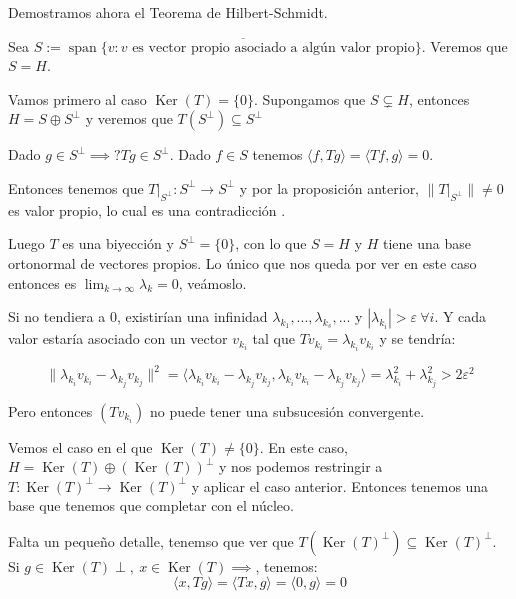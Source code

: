 \documentclass[openany]{book}
\begin{document}
Demostramos ahora el Teorema de Hilbert-Schmidt.

\begin{demonstration}

    Sea $ S:= \overline{\operatorname{span} \{v:  v \text{ es vector propio asociado a algún valor propio}\}}$. Veremos que $ S = H$.

    Vamos primero al caso $ \operatorname{Ker}(T) = \{0\}$. Supongamos que $ S \subsetneq H$, entonces $ H = S \oplus S^\perp $ y veremos que $ T(S^\perp) \subseteq  S^\perp$

    Dado $ g \in S^\perp \implies ? Tg \in S^{\perp}$. Dado $ f \in S$ tenemos $ \langle f, Tg \rangle = \langle Tf, g \rangle = 0$.

    Entonces tenemos que $ T|_{S^{\perp}}: S^\perp \to S^\perp$ y por la proposición anterior, $ \|T|_{S^{\perp}}\| \ne 0$ es valor propio, lo cual es una contradicción .

    Luego $ T$ es una biyección y $ S^{\perp} = \{0\}$, con lo que $ S = H$ y $ H$ tiene una base ortonormal de vectores propios. Lo único que nos queda por ver en este caso entonces es $ \lim_{k \to \infty} \lambda_k = 0 $, veámoslo.

    Si no tendiera a 0, existirían una infinidad $ \lambda _{k_1},...,\lambda _{k_{s}},...$ y $ |\lambda _{k_i}| > \varepsilon \ \forall i$. Y cada valor estaría asociado con un vector $ v_{k_i}$ tal que $ Tv_{k_i} = \lambda _{k_i}v_{k_i}$ y se tendría:

    $$ \|\lambda _{k_i} v_{k_i} - \lambda _{k_j}v_{k_j}\|^2 = \langle \lambda _{k_i}v_{k_i}- \lambda _{k_j}v_{k_j}, \lambda _{k_i}v_{k_i}-\lambda _{k_j}v_{k_j} \rangle = \lambda_{k_i}^2 + \lambda_{k_j}^2 > 2 \varepsilon^2 $$

    Pero entonces $ (Tv_{k_i})$ no puede tener una subsucesión convergente.

    Vemos el caso en el que $ \operatorname{Ker}(T) \ne \{0\}$. En este caso, $ H = \operatorname{Ker}(T) \oplus (\operatorname{Ker}(T))^{\perp}$ y nos podemos restringir a $ T: \operatorname{Ker}(T)^{\perp}\to \operatorname{Ker}(T)^{\perp}$ y aplicar el caso anterior. Entonces tenemos una base que tenemos que completar con el núcleo. 

    Falta un pequeño detalle, tenemso que ver que $ T(\operatorname{Ker}(T)^{\perp}) \subseteq \operatorname{Ker}(T)^{\perp}$. Si $g \in \operatorname{Ker}(T)\perp ,\ x \in \operatorname{Ker}(T) \implies $, tenemos:
    $$ \langle x, Tg \rangle = \langle Tx, g \rangle = \langle 0, g \rangle = 0 $$

\end{demonstration}
\end{document}
